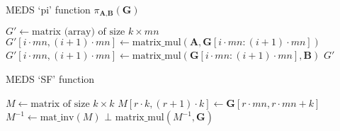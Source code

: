\begin{algorithm}
  \caption{MEDS `pi' function $\pi_{\textbf{A}, \textbf{B}}(\textbf{G})$}
  \label{alg:medspifunction}
  \begin{algorithmic}
      \State $G' \gets \text{matrix (array) of size } k \times mn$
        \State $G'[i \cdot mn, (i+1) \cdot mn] \gets \text{matrix\_mul}(\textbf{A}, \textbf{G}[i \cdot mn:(i+1) \cdot mn])$
        \State $G'[i \cdot mn, (i+1) \cdot mn] \gets \text{matrix\_mul}(\textbf{G}[i \cdot mn:(i+1) \cdot mn], \textbf{B})$
      \EndFor
      \State \Return $G'$
    \EndFunction
  \end{algorithmic}
\end{algorithm}

\begin{algorithm}
  \caption{MEDS `SF' function}
  \label{alg:medssffunction}
  \begin{algorithmic}
      \State $M \gets \text{matrix of size } k \times k$
        \State $M[r \cdot k, (r+1) \cdot k] \gets \textbf{G}[r \cdot mn, r \cdot mn + k]$
      \EndFor
      \State $M^{-1} \gets \text{mat\_inv}(M)$
        \State \Return $\bot$
      \EndIf
      \State \Return $\text{matrix\_mul}(M^{-1}, \textbf{G})$
    \EndFunction
  \end{algorithmic}
\end{algorithm}

